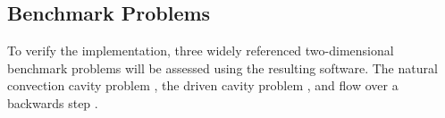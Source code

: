 \documentclass[letterpaper,12pt]{article}
\begin{document}
\subsection{Benchmark Problems}
To verify the implementation, three widely referenced two-dimensional
benchmark problems will be assessed using the resulting software. The
natural convection cavity problem \cite{davis_1983}, the driven cavity
problem \cite{ghia_1982}, and flow over a backwards step
\cite{gartling_1990}.

\pagebreak


\end{document}
